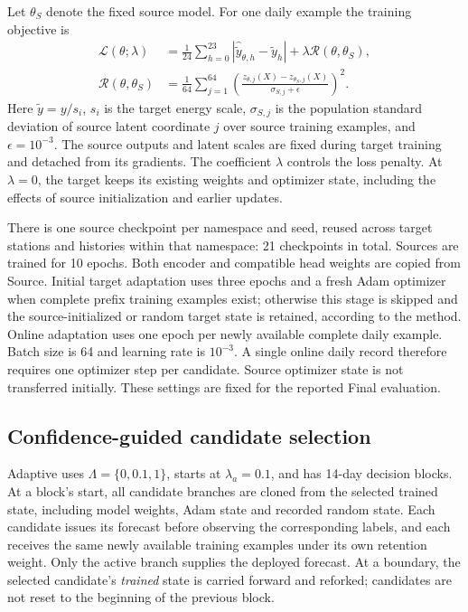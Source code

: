 \documentclass[pdflatex,iicol,sn-mathphys-num]{sn-jnl}
\begin{document}
Let $\theta_S$ denote the fixed source model. For one daily example the training objective is
{
\begin{align}
 \mathcal L(\theta;\lambda)&=\frac{1}{24}\sum_{h=0}^{23}|\widehat{\widetilde y}_{\theta,h}-\widetilde y_h|+\lambda\mathcal R(\theta,\theta_S),\label{eq:loss}\\
 \mathcal R(\theta,\theta_S)&=\frac{1}{64}\sum_{j=1}^{64}\left(\frac{z_{\theta,j}(X)-z_{\theta_S,j}(X)}{\sigma_{S,j}+\epsilon}\right)^2.\label{eq:retention}
\end{align}
}
Here $\widetilde y=y/s_i$, $s_i$ is the target energy scale, $\sigma_{S,j}$ is the population standard deviation of source latent coordinate $j$ over source training examples, and $\epsilon=10^{-3}$. The source outputs and latent scales are fixed during target training and detached from its gradients. The coefficient $\lambda$ controls the loss penalty. At $\lambda=0$, the target keeps its existing weights and optimizer state, including the effects of source initialization and earlier updates.

There is one source checkpoint per namespace and seed, reused across target stations and histories within that namespace: 21 checkpoints in total. Sources are trained for 10 epochs. Both encoder and compatible head weights are copied from Source. Initial target adaptation uses three epochs and a fresh Adam optimizer when complete prefix training examples exist; otherwise this stage is skipped and the source-initialized or random target state is retained, according to the method. Online adaptation uses one epoch per newly available complete daily example. Batch size is 64 and learning rate is $10^{-3}$. A single online daily record therefore requires one optimizer step per candidate. Source optimizer state is not transferred initially. These settings are fixed for the reported Final evaluation.

\subsection{Confidence-guided candidate selection}
Adaptive uses $\Lambda=\{0,0.1,1\}$, starts at $\lambda_a=0.1$, and has 14-day decision blocks. At a block's start, all candidate branches are cloned from the selected trained state, including model weights, Adam state and recorded random state. Each candidate issues its forecast before observing the corresponding labels, and each receives the same newly available training examples under its own retention weight. Only the active branch supplies the deployed forecast. At a boundary, the selected candidate's \emph{trained} state is carried forward and reforked; candidates are not reset to the beginning of the previous block.
\end{document}
